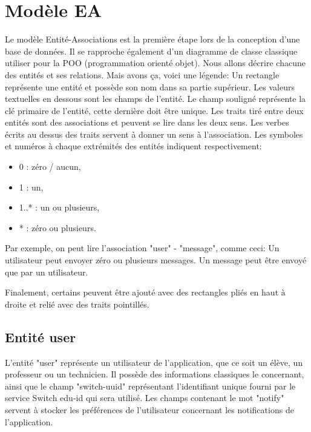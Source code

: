 \documentclass[
    iai, %
    il, %
]{heig-tb}
\begin{document}
\section{Modèle EA}
Le modèle Entité-Associations est la première étape lors de la conception d'une base de données. Il se rapproche également d'un diagramme de classe classique utiliser pour la POO (programmation orienté objet). \newline
Nous allons décrire chacune des entités et ses relations. \newline
Mais avons ça, voici une légende:\newline
Un rectangle représente une entité et possède son nom dans sa partie supérieur.\newline
Les valeurs textuelles en dessous sont les champs de l'entité. Le champ souligné représente la clé primaire de l'entité, cette dernière doit être unique.\newline
Les traits tiré entre deux entités sont des associations et peuvent se lire dans les deux sens. Les verbes écrits au dessus des traits servent à donner un sens à l'association. \newline
Les symboles et numéros à chaque extrémités des entités indiquent respectivement:
\begin{itemize}
    \item 0 : zéro / aucun,
    \item 1 : un,
    \item 1..* : un ou plusieurs,
    \item * : zéro ou plusieurs.
\end{itemize}

Par exemple, on peut lire l'association "user" - "message", comme ceci: \newline
Un utilisateur peut envoyer zéro ou plusieurs messages. \newline
Un message peut être envoyé que par un utilisateur.

Finalement, certains peuvent être ajouté avec des rectangles pliés en haut à droite et relié avec des traits pointillés.


\subsection{Entité user}
L'entité "user" représente un utilisateur de l'application, que ce soit un élève, un professeur ou un technicien.\newline
Il possède des informations classiques le concernant, ainsi que le champ "switch-uuid" représentant l'identifiant unique fourni par le service Switch edu-id qui sera utilisé.\newline
Les champs contenant le mot "notify" servent à stocker les préférences de l'utilisateur concernant les notifications de l'application.
\end{document}
